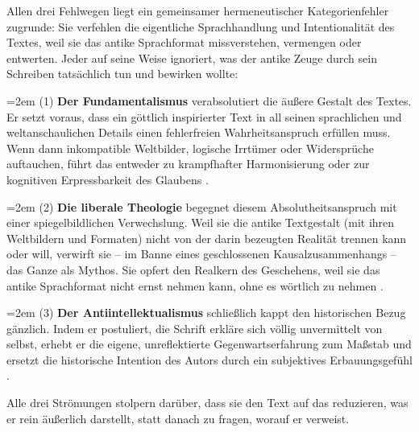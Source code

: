 \documentclass[11pt,a4paper]{article}
\newcommand{\subpar}[1]{%
  \begingroup
  \leftskip=2em %
  \noindent#1\par
  \endgroup
}
\begin{document}
Allen drei Fehlwegen liegt ein gemeinsamer hermeneutischer Kategorienfehler zugrunde: Sie verfehlen die eigentliche Sprachhandlung und Intentionalität des Textes, weil sie das antike Sprachformat missverstehen, vermengen oder entwerten. Jeder auf seine Weise ignoriert, was der antike Zeuge durch sein Schreiben tatsächlich tun und bewirken wollte:

\subpar{(1) \textbf{Der Fundamentalismus} verabsolutiert die äußere Gestalt des Textes. Er setzt voraus, dass ein göttlich inspirierter Text in all seinen sprachlichen und weltanschaulichen Details einen fehlerfreien Wahrheitsanspruch erfüllen muss. Wenn dann inkompatible Weltbilder, logische Irrtümer oder Widersprüche auftauchen, führt das entweder zu krampfhafter Harmonisierung oder zur kognitiven Erpressbarkeit des Glaubens \citep{barr1977}.}

\subpar{(2) \textbf{Die liberale Theologie} begegnet diesem Absolutheitsanspruch mit einer spiegelbildlichen Verwechslung. Weil sie die antike Textgestalt (mit ihren Weltbildern und Formaten) nicht von der darin bezeugten Realität trennen kann oder will, verwirft sie – im Banne eines geschlossenen Kausalzusammenhangs – das Ganze als Mythos. Sie opfert den Realkern des Geschehens, weil sie das antike Sprachformat nicht ernst nehmen kann, ohne es wörtlich zu nehmen \citep{schlatter1905,machen1923}.}

\subpar{(3) \textbf{Der Antiintellektualismus} schließlich kappt den historischen Bezug gänzlich. Indem er postuliert, die Schrift erkläre sich völlig unvermittelt von selbst, erhebt er die eigene, unreflektierte Gegenwartserfahrung zum Maßstab und ersetzt die historische Intention des Autors durch ein subjektives Erbauungsgefühl \citep{noll1994}.}

Alle drei Strömungen stolpern darüber, dass sie den Text auf das reduzieren, was er rein äußerlich darstellt, statt danach zu fragen, worauf er verweist.
\end{document}
